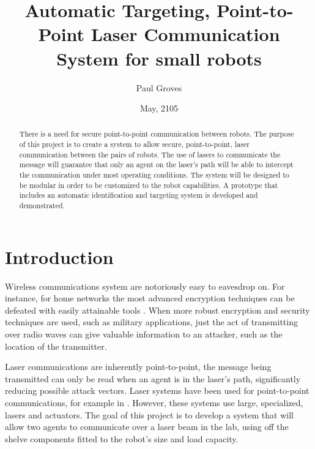 \documentclass[botnum, fleqn]{unmeethesis}
\begin{document}
\frontmatter
\title{Automatic Targeting, Point-to-Point Laser Communication System for small robots}
\author{Paul Groves}
\date{May, 2105}
\maketitle
\makecopyright
\maketitleabstract %

\begin{abstract}
There is a need for secure point-to-point communication between robots. The purpose of this project is to create a system to allow secure, point-to-point, laser communication between the pairs of robots. The use of lasers to communicate the message will guarantee that only an agent on the laser's path will be able to intercept the communication under most operating conditions. The system will be designed to be modular in order to be customized to the robot capabilities. A prototype that includes an automatic identification and targeting system is developed and demonstrated. 

\end{abstract}

\mainmatter
\section*{Introduction} \label{chp:introduction}
Wireless communications system are notoriously easy to eavesdrop on. For instance, for home networks the most advanced encryption techniques can be defeated with easily attainable tools \cite{wireless_vulnerabilities}.  When more robust encryption and security techniques are used, such as military applications, just the act of transmitting over radio waves can give valuable information to an attacker, such as the location of the transmitter\cite{wireless_triangulation}.

Laser communications are inherently point-to-point, the message being transmitted can only be read when an agent is in the laser's path, significantly reducing possible attack vectors. Laser systems have been used for point-to-point communications, for example in \cite{nasa_laser}\cite{transportable_laser}. However, these systems use large, specialized, lasers and actuators. The goal of this project is to develop a system that will allow two agents to communicate over a laser beam in the lab, using off the shelve components fitted to the robot's size and load capacity.
\end{document}
